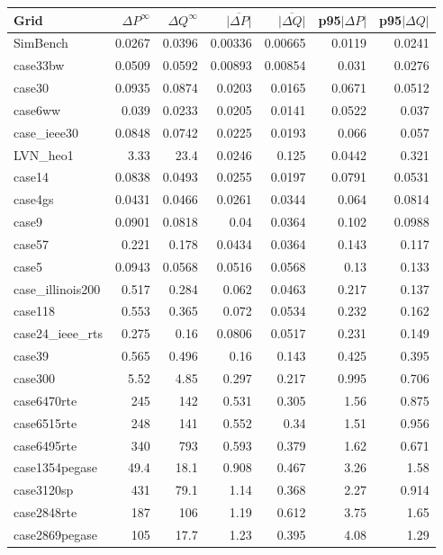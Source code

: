 \documentclass[10pt]{article}
\begin{document}
\begin{table}[H]
\centering
\small
\begin{tabular}{lrrrrrr}
\toprule
Grid & $\Delta P^{\infty}$ & $\Delta Q^{\infty}$ & $\overline{|\Delta P|}$ & $\overline{|\Delta Q|}$ & p95$|\Delta P|$ & p95$|\Delta Q|$ \\
\midrule
SimBench & 0.0267 & 0.0396 & 0.00336 & 0.00665 & 0.0119 & 0.0241 \\
case33bw & 0.0509 & 0.0592 & 0.00893 & 0.00854 & 0.031 & 0.0276 \\
case30 & 0.0935 & 0.0874 & 0.0203 & 0.0165 & 0.0671 & 0.0512 \\
case6ww & 0.039 & 0.0233 & 0.0205 & 0.0141 & 0.0522 & 0.037 \\
case\_ieee30 & 0.0848 & 0.0742 & 0.0225 & 0.0193 & 0.066 & 0.057 \\
LVN\_heo1 & 3.33 & 23.4 & 0.0246 & 0.125 & 0.0442 & 0.321 \\
case14 & 0.0838 & 0.0493 & 0.0255 & 0.0197 & 0.0791 & 0.0531 \\
case4gs & 0.0431 & 0.0466 & 0.0261 & 0.0344 & 0.064 & 0.0814 \\
case9 & 0.0901 & 0.0818 & 0.04 & 0.0364 & 0.102 & 0.0988 \\
case57 & 0.221 & 0.178 & 0.0434 & 0.0364 & 0.143 & 0.117 \\
case5 & 0.0943 & 0.0568 & 0.0516 & 0.0568 & 0.13 & 0.133 \\
case\_illinois200 & 0.517 & 0.284 & 0.062 & 0.0463 & 0.217 & 0.137 \\
case118 & 0.553 & 0.365 & 0.072 & 0.0534 & 0.232 & 0.162 \\
case24\_ieee\_rts & 0.275 & 0.16 & 0.0806 & 0.0517 & 0.231 & 0.149 \\
case39 & 0.565 & 0.496 & 0.16 & 0.143 & 0.425 & 0.395 \\
case300 & 5.52 & 4.85 & 0.297 & 0.217 & 0.995 & 0.706 \\
case6470rte & 245 & 142 & 0.531 & 0.305 & 1.56 & 0.875 \\
case6515rte & 248 & 141 & 0.552 & 0.34 & 1.51 & 0.956 \\
case6495rte & 340 & 793 & 0.593 & 0.379 & 1.62 & 0.671 \\
case1354pegase & 49.4 & 18.1 & 0.908 & 0.467 & 3.26 & 1.58 \\
case3120sp & 431 & 79.1 & 1.14 & 0.368 & 2.27 & 0.914 \\
case2848rte & 187 & 106 & 1.19 & 0.612 & 3.75 & 1.65 \\
case2869pegase & 105 & 17.7 & 1.23 & 0.395 & 4.08 & 1.29 \\

\end{tabular}
\end{table}
\end{document}

